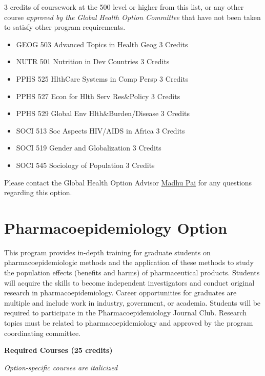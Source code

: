 \documentclass[
  letterpaper,
  DIV=11,
  numbers=noendperiod]{scrreprt}
\providecommand{\tightlist}{%
  \setlength{\itemsep}{0pt}\setlength{\parskip}{0pt}}
\begin{document}
3 credits of coursework at the 500 level or higher from this list, or
any other course \emph{approved by the Global Health Option Committee}
that have not been taken to satisfy other program requirements.

\begin{itemize}
\tightlist
\item
  GEOG 503 Advanced Topics in Health Geog 3 Credits
\item
  NUTR 501 Nutrition in Dev Countries 3 Credits
\item
  PPHS 525 HlthCare Systems in Comp Persp 3 Credits
\item
  PPHS 527 Econ for Hlth Serv Res\&Policy 3 Credits
\item
  PPHS 529 Global Env Hlth\&Burden/Disease 3 Credits
\item
  SOCI 513 Soc Aspects HIV/AIDS in Africa 3 Credits
\item
  SOCI 519 Gender and Globalization 3 Credits
\item
  SOCI 545 Sociology of Population 3 Credits
\end{itemize}

Please contact the Global Health Option Advisor
\href{mailto:madhukar.pai@mcgill.ca}{Madhu Pai} for any questions
regarding this option.

\section{Pharmacoepidemiology Option}\label{pharmacoepidemiology-option}

This program provides in-depth training for graduate students on
pharmacoepidemiologic methods and the application of these methods to
study the population effects (benefits and harms) of pharmaceutical
products. Students will acquire the skills to become independent
investigators and conduct original research in pharmacoepidemiology.
Career opportunities for graduates are multiple and include work in
industry, government, or academia. Students will be required to
participate in the Pharmacoepidemiology Journal Club. Research topics
must be related to pharmacoepidemiology and approved by the program
coordinating committee.

\textbf{Required Courses (25 credits)}

\emph{Option-specific courses are italicized}
\end{document}
